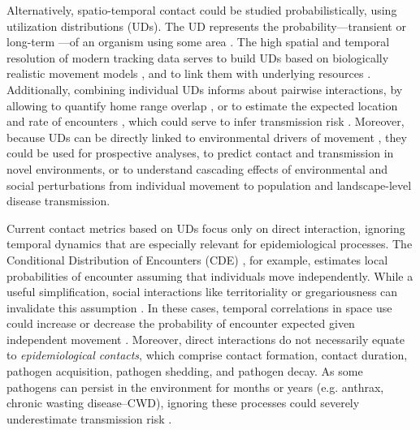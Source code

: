 \documentclass[letterpaper]{article}
\begin{document}
Alternatively, spatio-temporal contact could be studied probabilistically, using utilization distributions (UDs). The UD represents the probability---transient or long-term \citep{Tao2016}---of an organism using some area \citep{Worton1989}. The high spatial and temporal resolution of modern tracking data serves to build UDs based on biologically realistic movement models \citep{Kranstauber2012,Fleming2014}, and to link them with underlying resources \citep{Potts2023}.
Additionally, combining individual UDs informs about pairwise interactions, by allowing to quantify home range overlap \citep{Winner2018}, or to estimate the expected location and rate of encounters \citep{Noonan2021}, which could serve to infer transmission risk \citep{Godfrey2010, Godfrey2013,Noonan2021}. 
Moreover, because UDs can be directly linked to environmental drivers of movement \citep{Signer2017}, they could be used for prospective analyses, to predict contact and transmission in novel environments, or to understand cascading effects of environmental and social perturbations from individual movement to population and landscape-level disease transmission. 

Current contact metrics based on UDs focus only on direct interaction, ignoring temporal dynamics that are especially relevant for epidemiological processes. The Conditional Distribution of Encounters (CDE) \citep{Noonan2021}, for example, estimates local probabilities of encounter assuming that individuals move independently.
While a useful simplification, social interactions like territoriality or gregariousness can invalidate this assumption \citep{Manlove2018,Sah2018}. In these cases, temporal correlations in space use could increase or decrease the probability of encounter expected given independent movement \citep{Kjaer2008,Schauber2015a}. 
Moreover, direct interactions do not necessarily equate to \emph{epidemiological contacts}, which comprise contact formation, contact duration, pathogen acquisition, pathogen shedding, and pathogen decay. As some pathogens can persist in the environment for months or years (e.g. anthrax, chronic wasting disease--CWD), ignoring these processes could severely underestimate transmission risk \citep{Wilber2022,Yang2023,Richardson2015}.

\end{document}
